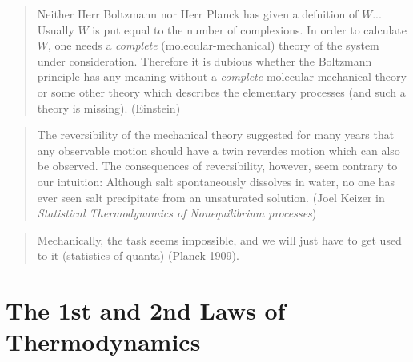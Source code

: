 \begin{quote}
Neither Herr Boltzmann nor Herr Planck has given 
a defnition of $W$...
Usually $W$ is put equal to the number of complexions. In order
to calculate $W$, one needs a \emph{complete} (molecular-mechanical) 
theory of the system under consideration. Therefore it is dubious 
whether the Boltzmann principle has any meaning without a 
\emph{complete} molecular-mechanical
theory or some other theory which describes the elementary processes (and such
a theory is missing). (Einstein)
\end{quote}
\begin{quote} The reversibility of the mechanical theory suggested for
many years that any observable motion should have a twin reverdes
motion which can also be observed. The consequences of reversibility,
however, seem contrary to our intuition: Although salt spontaneously
dissolves in water, no one has ever seen salt precipitate from an
unsaturated solution. (Joel Keizer in \emph{Statistical Thermodynamics
of Nonequilibrium processes})
\end{quote}
\begin{quote} Mechanically, the task seems impossible, and we will just
have to get used to it (statistics of quanta) (Planck 1909).
\end{quote}
\normalsize


\section{The 1st and 2nd Laws of Thermodynamics}

